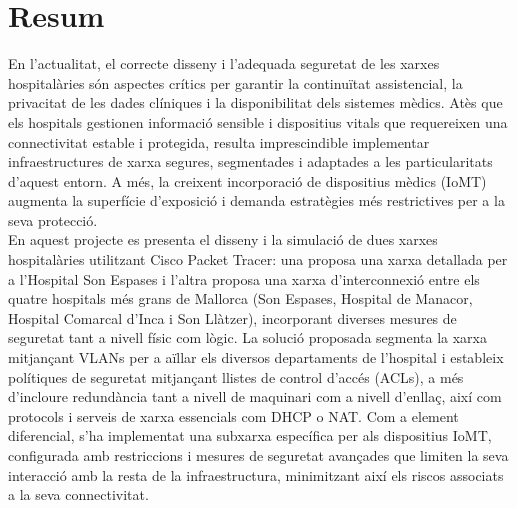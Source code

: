
\chapter{Resum}
En l'actualitat, el correcte disseny i l'adequada seguretat de les xarxes hospitalàries són aspectes crítics per garantir la continuïtat assistencial,
la privacitat de les dades clíniques i la disponibilitat dels sistemes mèdics. Atès que els hospitals gestionen informació sensible i dispositius
vitals que requereixen una connectivitat estable i protegida, resulta imprescindible implementar infraestructures de xarxa segures, segmentades i adaptades a les
particularitats d'aquest entorn. A més, la creixent incorporació de dispositius mèdics (IoMT) augmenta la superfície d'exposició i demanda
estratègies més restrictives per a la seva protecció. \\

En aquest projecte es presenta el disseny i la simulació de dues xarxes hospitalàries utilitzant Cisco Packet Tracer: una proposa una xarxa detallada per a l'Hospital Son Espases i l'altra
proposa una xarxa d'interconnexió entre els quatre hospitals més grans de Mallorca (Son Espases, Hospital de Manacor, Hospital Comarcal d'Inca i Son Llàtzer), incorporant diverses mesures de seguretat tant a
nivell físic com lògic. La solució proposada segmenta la xarxa mitjançant VLANs per a aïllar els diversos departaments de l'hospital i estableix polítiques de
seguretat mitjançant llistes de control d'accés (ACLs), a més d'incloure redundància tant a nivell de maquinari com a
nivell d'enllaç, així com protocols i serveis de xarxa essencials com DHCP o NAT. Com a element diferencial, s'ha implementat una subxarxa específica per als dispositius IoMT, configurada amb restriccions i mesures de seguretat
avançades que limiten la seva interacció amb la resta de la infraestructura, minimitzant així els riscos associats a la seva connectivitat.